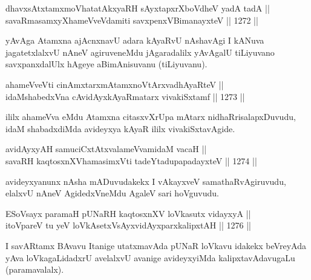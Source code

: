 
\begin{shl}
dhavxsAtxtamxmoVhatatAkxyaRH sAyxtapxrXboVdheV yadA tadA || \\
savaRmasamxyXhameVveVdamiti savxpenxV\s BimanayxteV \hfill || 1272 || 
\end{shl}

\begin{artha}
yAvAga Atamxna ajAcnxnavU adara kAyaRvU nAshavAgi I kANuva jagatetxlalxvU nAneV agiruveneMdu jAgaradalilx yAvAgalU tiLiyuvano savxpanxdalUlx hAgeye aBimAnisuvanu (tiLiyuvanu).
\end{artha}


\begin{shl}
ahameVveVti cinAmxtarxmAtamxnoV\s tArxvadhAyaRteV || \\
idaMshabedxVna cAvidAyxkAyaRmatarx vivakiSxtamf \hfill || 1273 ||  
\end{shl}

\begin{artha}
ililx ahameVva eMdu Atamxna citasxvXrUpa mAtarx nidhaRrisalapxDuvudu, idaM shabadxdiMda avideyxya kAyaR ililx vivakiSxtavAgide.
\end{artha}


\begin{shl}
avidAyxyAH samuciCxtAtxvalameVvamidaM vacaH || \\
\footnotemark[1]savaRH kaqtosxnXV\s hamasimxVti tadeYtadupapadayxteV \hfill || 1274 ||  
\end{shl}

\begin{artha}
avideyxyanunx nAsha mADuvudakekx I vAkayxveV samathaRvAgiruvudu, elalxvU nAneV AgidedxVneMdu AgaleV sari hoVguvudu.
\end{artha}


\begin{shl}
ESoV\s sayx paramaH pUNaRH kaqtosxnXV loVkasutx vidayxyA || \\
itoV\s pareV tu yeV loVkAsetxV\s sAyxvidAyxparxkalipxtAH \hfill || 1276 ||  
\end{shl}

\begin{artha}
I savARtamx BAvavu Itanige utatxmavAda pUNaR loVkavu idakekx beVreyAda yAva loVkagaLidadxrU avelalxvU avanige avideyxyiMda kalipxtavAdavugaLu (paramavalalx).
\end{artha}

